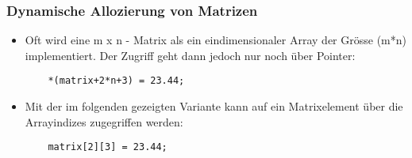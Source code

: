 \subsubsection{Dynamische Allozierung von Matrizen\hfill}
\label{sec:Dynamische Allozierung von Matrizen}
\begin{itemize}
	\item Oft wird eine m x n - Matrix als ein eindimensionaler Array der Grösse (m*n) implementiert. Der Zugriff geht dann jedoch nur noch über Pointer:
	\noindent
	\begin{minipage}{\linewidth}
	\begin{lstlisting}
	*(matrix+2*n+3) = 23.44;
	\end{lstlisting}
	\end{minipage}
	\item Mit der im folgenden gezeigten Variante kann auf ein Matrixelement über die Arrayindizes zugegriffen werden:
	\begin{minipage}{\linewidth}
	\begin{lstlisting}
	matrix[2][3] = 23.44;
	\end{lstlisting}
	\end{minipage}
\end{itemize}

